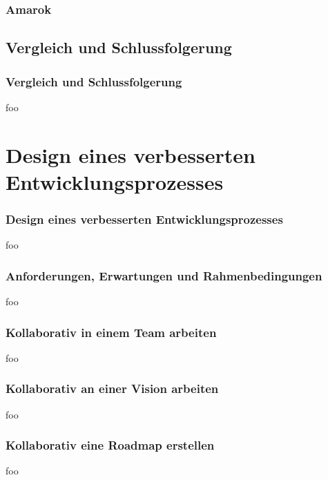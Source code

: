 \documentclass{beamer}
\begin{document}
\begin{frame}
\frametitle{Amarok}
\begin{center}
\end{center}
\end{frame}

\subsection{Vergleich und Schlussfolgerung}

\begin{frame}
\frametitle{Vergleich und Schlussfolgerung}
foo
\end{frame}

\section{Design eines verbesserten Entwicklungsprozesses}

\begin{frame}
\frametitle{Design eines verbesserten Entwicklungsprozesses}
foo
\end{frame}

\begin{frame}
\frametitle{Anforderungen, Erwartungen und Rahmenbedingungen}
foo
\end{frame}

\begin{frame}
\frametitle{Kollaborativ in einem Team arbeiten}
foo
\end{frame}

\begin{frame}
\frametitle{Kollaborativ an einer Vision arbeiten}
foo
\end{frame}

\begin{frame}
\frametitle{Kollaborativ eine Roadmap erstellen}
foo
\end{frame}
\end{document}
